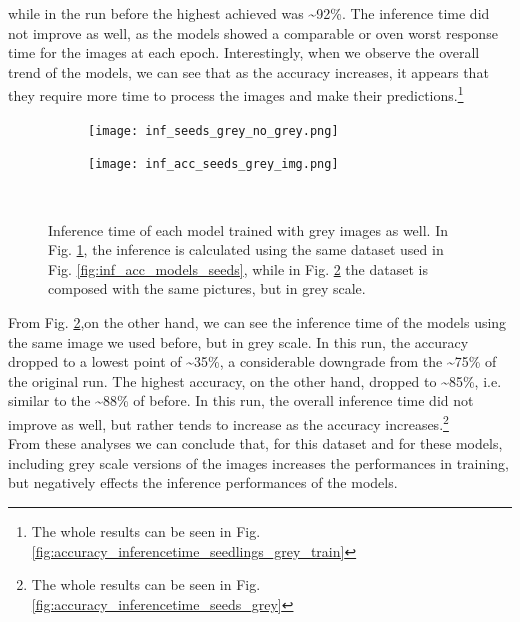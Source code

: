 while in the run before the highest achieved was \textasciitilde92\%. The inference time did not improve as well, as the models showed a comparable or oven worst response time for the images at each epoch. Interestingly, when we observe the overall trend of the models, we can see that as the accuracy increases, it appears that they require more time to process the images and make their predictions.\footnote{The whole results can be seen in Fig. \ref{fig:accuracy_inferencetime_seedlings_grey_train}}\\


\begin{figure}[h]
     \begin{subfigure}{0.5\textwidth}
	    \texttt{[image: inf\_seeds\_grey\_no\_grey.png]}
	    \caption{}
         \label{fig:inf_seeds_grey_no_grey}
     \end{subfigure}
     \hfill
     \begin{subfigure}{0.5\textwidth}
	    \texttt{[image: inf\_acc\_seeds\_grey\_img.png]}
	    \caption{}
        \label{fig:inf_acc_seeds_grey_img}
     \end{subfigure}\\
     \caption[Inference time of each model trained with grey images as well]{Inference time of each model trained with grey images as well. In Fig. \ref{fig:inf_seeds_grey_no_grey}, the inference is calculated using the same dataset used in Fig. \ref{fig:inf_acc_models_seeds}, while in Fig.  \ref{fig:inf_acc_seeds_grey_img} the dataset is composed with the same pictures, but in grey scale. }
        \label{fig:inf_seeds_with_grey}
\end{figure}


From Fig. \ref{fig:inf_acc_seeds_grey_img},on the other hand, we can see the inference time of the models using the same image we used before, but in grey scale. In this run, the accuracy dropped to a lowest point of \textasciitilde35\%, a considerable downgrade from the \textasciitilde75\% of the original run. The highest accuracy, on the other hand, dropped to \textasciitilde85\%, i.e. similar to the \textasciitilde88\% of before. In this run, the overall inference time did not improve as well, but rather tends to increase as the accuracy increases.\footnote{The whole results can be seen in Fig. \ref{fig:accuracy_inferencetime_seeds_grey}} \\

From these analyses we can conclude that, for this dataset and for these models, including grey scale versions of the images increases the performances in training, but negatively effects the inference performances of the models. 
